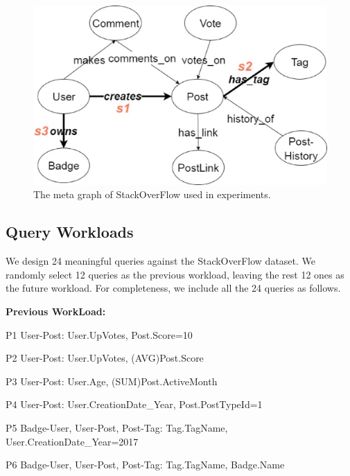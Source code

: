 \begin{figure}[H]
	\centering
	\includegraphics[scale=0.5]{pic/MetaExpS.eps}
	\caption{The meta graph of StackOverFlow used in experiments.}
	\label{fig:5:1}
\end{figure}


\subsection{Query Workloads}
We design 24 meaningful queries against the StackOverFlow dataset. We randomly select 12 queries as the previous workload, leaving the rest 12 ones as the future workload. For completeness, we include all the 24 queries as follows. %


\textbf{Previous WorkLoad:}

P1 \hspace{3mm} User-Post: User.UpVotes, Post.Score=10

P2 \hspace{3mm} User-Post: User.UpVotes, (AVG)Post.Score

P3 \hspace{3mm} User-Post: User.Age, (SUM)Post.ActiveMonth

P4 \hspace{3mm} User-Post: User.CreationDate\_Year, Post.PostTypeId=1

P5 \hspace{3mm} Badge-User, User-Post, Post-Tag: Tag.TagName, User.CreationDate\_Year=2017

P6 \hspace{3mm} Badge-User, User-Post, Post-Tag: Tag.TagName, Badge.Name


